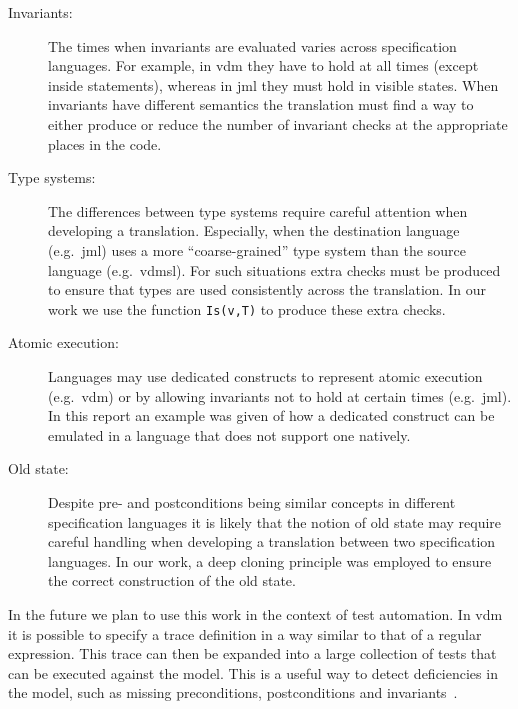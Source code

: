 \begin{description}

\item[Invariants:] The times when invariants are evaluated varies
  across specification languages. For example, in \ac{vdm} they have
  to hold at all times (except inside  statements), whereas
  in \ac{jml} they must hold in visible states. When invariants have
  different semantics the translation must find a way to either
  produce or reduce the number of invariant checks at the appropriate
  places in the code.

\item[Type systems:] The differences between type systems require
  careful attention when developing a translation. Especially, when
  the destination language (e.g.\ \ac{jml}) uses a more
  ``coarse-grained'' type system than the source language (e.g.\
  \ac{vdmsl}). For such situations extra checks must be produced to
  ensure that types are used consistently across the translation. In
  our work we use the function \texttt{Is(v,T)} to produce these extra
  checks.

\item [Atomic execution:] Languages may use dedicated constructs to
  represent atomic execution (e.g.\ \ac{vdm}) or by allowing
  invariants not to hold at certain times (e.g.\ \ac{jml}). In this
  report an example was given of how a dedicated construct can be
  emulated in a language that does not support one natively.

\item [Old state:] Despite pre- and postconditions being similar
  concepts in different specification languages it is likely that the
  notion of old state may require careful handling when developing a
  translation between two specification languages. In our work, a deep
  cloning principle was employed to ensure the correct construction of
  the old state.

\end{description}

In the future we plan to use this work in the context of test
automation. In \ac{vdm} it is possible to specify a trace definition
in a way similar to that of a regular expression. This trace can then
be expanded into a large collection of tests that can be executed
against the model. This is a useful way to detect deficiencies in the
model, such as missing preconditions, postconditions and
invariants~\cite{Larsen&10c}.

